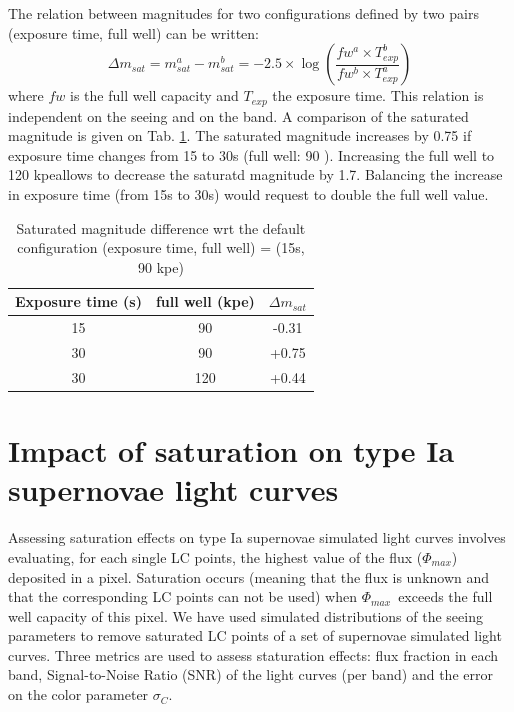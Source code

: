 \documentclass[\docopts]{\docclass}
\newcommand{\pe}{{pe}}
\newcommand{\phimax}{{$\Phi_{max}$}}
\newcommand{\colorerr}{{$\sigma_C$}}
\begin{document}
The relation between magnitudes for two configurations defined by two pairs (exposure time, full well) can be written:
\begin{equation}
\Delta m_{sat} = m^a_{sat}-m^b_{sat} = -2.5 \times \log\left(\frac{fw^a\times T_{exp}^b}{fw^b \times T_{exp}^a}\right)
 \end{equation}
where $fw$ is the full well capacity and $T_{exp}$ the exposure time. This relation is independent on the seeing and on the band. A comparison of the saturated magnitude is given on Tab. \ref{tab:satmagdiff}. The saturated magnitude increases by 0.75 if exposure time changes from 15 to 30s (full well: 90 \kpe). Increasing the full well to 120 k\pe allows to decrease the saturatd magnitude by 1.7. Balancing the increase in exposure time (from 15s to 30s) would request to double the full well value. 

\begin{table}[!htbp]
  \caption{Saturated magnitude difference wrt the default configuration (exposure time, full well) = (15s, 90 k\pe)}\label{tab:satmagdiff}
  \begin{center}
    \begin{tabular}{c|c|c}
      \hline
      \hline
      Exposure time (s) & full well (k\pe) & $\Delta m_{sat} $\\
      \hline
      \hline
      15  & 90 & -0.31\\
      30 & 90 & +0.75\\
      30 & 120 & +0.44\\
      \hline
    \end{tabular}
  \end{center}
  \end{table}


\section{Impact of saturation on type Ia supernovae light curves}
\label{sec:sn_saturation}
Assessing saturation effects on type Ia supernovae simulated light curves involves evaluating, for each single LC points, the highest value of the flux (\phimax) deposited in a pixel. Saturation occurs (meaning that the flux is unknown and that the corresponding LC points can not be used) when \phimax~exceeds the full well capacity of this pixel. We have used simulated distributions of the seeing parameters to remove saturated LC points of a set of supernovae simulated light curves. Three metrics are used to assess staturation effects: flux fraction in each band, Signal-to-Noise Ratio (SNR) of the light curves (per band) and the error on the color parameter \colorerr.
\end{document}
